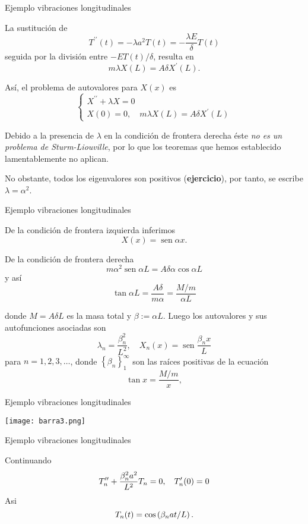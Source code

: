  

 
{Ejemplo vibraciones longitudinales}


La sustitución de
$$
T^{\prime \prime}(t)=-\lambda a^{2} T(t)=-\frac{\lambda E}{\delta} T(t)
$$
seguida por la división entre $-E T(t) / \delta$, resulta en 
$$m \lambda X(L)=A \delta X^{\prime}(L).$$


Así, el problema de autovalores para $X(x)$ es
$$
\left\{
\begin{array}{l}
X^{\prime \prime}+\lambda X=0 \\
X(0)=0, \quad m \lambda X(L)=A \delta X^{\prime}(L)
\end{array}
\right.
$$

Debido a la presencia de $\lambda$ en la condición de frontera derecha  éste \emph{no es un problema de Sturm-Liouville}, por lo que los teoremas que hemos establecido lamentablemente no aplican. 

No obstante, todos los eigenvalores  son positivos (\textbf{ejercicio}), por tanto, se escribe $\lambda=\alpha^{2}$.



 

 
{Ejemplo vibraciones longitudinales}

De la condición de frontera izquierda inferimos
$$X(x)=\operatorname{sen} \alpha x.$$ 


De la condición de frontera derecha 
$$
m \alpha^{2} \operatorname{sen} \alpha L=A \delta \alpha \cos \alpha L
$$
y así
$$
\tan \alpha L=\frac{A \delta}{m \alpha}=\frac{M / m}{\alpha L}
$$



donde  $M=A \delta L$ es la masa total y $\beta:=\alpha L$.
Luego  los autovalores y sus autofunciones asociadas son
$$
\lambda_{n}=\frac{\beta_{n}^{2}}{L^{2}}, \quad X_{n}(x)=\operatorname{sen} \frac{\beta_{n} x}{L}
$$
para $n=1,2,3, \ldots$, donde $\left\{\beta_{n}\right\}^{\infty}_1$ son las raíces positivas de la ecuación
$$
\tan x=\frac{M / m}{x},
$$

 

 
{Ejemplo vibraciones longitudinales}
\begin{center}
\texttt{[image: barra3.png]}
\end{center}

 

 
{Ejemplo vibraciones longitudinales}

Continuando 
$$\small
T_{n}^{\prime \prime}+\frac{\beta_{n}^{2} a^{2}}{L^{2}} T_{n}=0, \quad T_{n}^{\prime}(0)=0
$$
Asi
$$\small T_{n}(t)=\cos \left(\beta_{n} a t / L\right).$$



